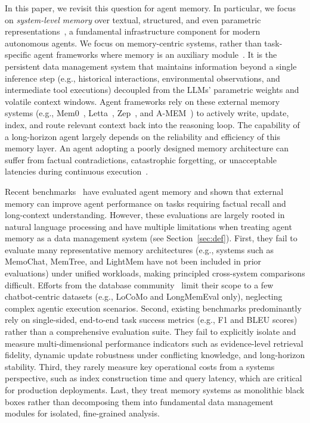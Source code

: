 In this paper, we revisit this question for agent memory. In particular, we focus on \textit{system-level memory} over textual, structured, and even parametric representations~\cite{chhikara2025mem0,packer2023memgpt,rasmussen2025zep,xu2025amem}, a fundamental infrastructure component for modern autonomous agents.
We focus on memory-centric systems, rather than task-specific agent frameworks where memory is an auxiliary module~\cite{claudecode, zhou2026dbcooker}.
It is the persistent data management system that maintains information beyond a single inference step (e.g., historical interactions, environmental observations, and intermediate tool executions) decoupled from the LLMs' parametric weights and volatile context windows. Agent frameworks rely on these external memory systems (e.g., Mem0~\cite{chhikara2025mem0}, Letta~\cite{packer2023memgpt}, Zep~\cite{rasmussen2025zep}, and A-MEM~\cite{xu2025amem}) to actively write, update, index, and route relevant context back into the reasoning loop. The capability of a long-horizon agent largely depends on the reliability and efficiency of this memory layer. An agent adopting a poorly designed memory architecture can suffer from factual contradictions, catastrophic forgetting, or unacceptable latencies during continuous execution~\cite{du2026memory,zheng2025lifelong}.

Recent benchmarks~\cite{maharana2024locomo,wu2024longmemeval,memoryagentbench2026,membench} have evaluated agent memory and shown that external memory can improve agent performance on tasks requiring factual recall and long-context understanding. However, these evaluations are largely rooted in natural language processing and have multiple limitations when treating agent memory as a data management system (see Section~\ref{sec:def}). 
First, they fail to evaluate many representative memory architectures (e.g., systems such as MemoChat, MemTree, and LightMem have not been included in prior evaluations) under unified workloads, making principled cross-system comparisons difficult. Efforts from the database community~\cite{wu2026memoryeab} limit their scope to a few chatbot-centric datasets (e.g., LoCoMo and LongMemEval only), neglecting complex agentic execution scenarios. 
Second, existing benchmarks predominantly rely on single-sided, end-to-end task success metrics (e.g., F1 and BLEU scores) rather than a comprehensive evaluation suite. They fail to explicitly isolate and measure multi-dimensional performance indicators such as evidence-level retrieval fidelity, dynamic update robustness under conflicting knowledge, and long-horizon stability. 
Third, they rarely measure key operational costs from a systems perspective, such as index construction time and query latency, which are critical for production deployments.
Last, they treat memory systems as monolithic black boxes rather than decomposing them into fundamental data management modules for isolated, fine-grained analysis.

